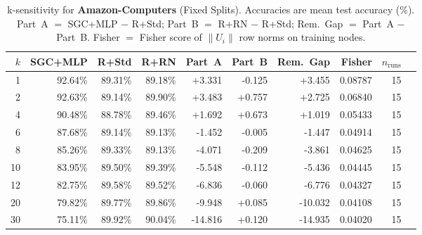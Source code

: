 \begin{table}[t]
\centering\small\setlength{\tabcolsep}{5pt}
\caption{k-sensitivity for \textbf{Amazon-Computers} (Fixed Splits). Accuracies are mean test accuracy (\%). Part~A $=$ SGC+MLP $-$ R+Std; Part~B $=$ R+RN $-$ R+Std; Rem.~Gap $=$ Part~A $-$ Part~B. Fisher $=$ Fisher score of $\|U_i\|$ row norms on training nodes.}
\label{tab:exp8_per_dataset_amazon-computers_fixed}
\begin{tabular}{rrrrrrrrrr}
\toprule
$k$ & SGC+MLP & R+Std & R+RN & Part~A & Part~B & Rem.~Gap & Fisher & $n_{\mathrm{runs}}$ \\
\midrule
1 & 92.64\% & 89.31\% & 89.18\% & +3.331 & -0.125 & +3.455 & 0.08787 & 15 \\
2 & 92.63\% & 89.14\% & 89.90\% & +3.483 & +0.757 & +2.725 & 0.06840 & 15 \\
4 & 90.48\% & 88.78\% & 89.46\% & +1.692 & +0.673 & +1.019 & 0.05433 & 15 \\
6 & 87.68\% & 89.14\% & 89.13\% & -1.452 & -0.005 & -1.447 & 0.04914 & 15 \\
8 & 85.26\% & 89.33\% & 89.13\% & -4.071 & -0.209 & -3.861 & 0.04625 & 15 \\
10 & 83.95\% & 89.50\% & 89.39\% & -5.548 & -0.112 & -5.436 & 0.04445 & 15 \\
12 & 82.75\% & 89.58\% & 89.52\% & -6.836 & -0.060 & -6.776 & 0.04327 & 15 \\
20 & 79.82\% & 89.77\% & 89.86\% & -9.948 & +0.085 & -10.032 & 0.04108 & 15 \\
30 & 75.11\% & 89.92\% & 90.04\% & -14.816 & +0.120 & -14.935 & 0.04020 & 15 \\
\bottomrule
\end{tabular}
\end{table}
